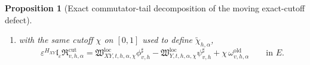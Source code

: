 \documentclass[11pt,a4paper]{amsart}
\theoremstyle{plain}
\newtheorem{proposition}[theorem]{Proposition}
\theoremstyle{definition}
\theoremstyle{remark}
\begin{document}
\begin{proposition}[Exact commutator-tail decomposition of the moving exact-cutoff defect]
\begin{enumerate}[label=(\roman*)]
and the rescaled old-tail source
\begin{equation}\label{eq:moving-cutoff-old-tail-local}
\omega_{v,h,\alpha}^{\mathrm{old}}
:=
\varepsilon^{H_{XY}}
\mathfrak l_{\varepsilon}
\mathfrak O_{v,h,\alpha}^{\mathrm{old}}
\in E,
\end{equation}
one has
\begin{equation}\label{eq:moving-cutoff-old-tail-local-id}
\mathfrak A_{XY,t,h,\alpha}\phi_{v,h}^{\sharp}
-
\mathfrak A_{Y,t,h,\alpha}\psi_{v,h}^{\sharp}
=
\omega_{v,h,\alpha}^{\mathrm{old}}
\qquad\text{in }E;
\end{equation}
\item with the same cutoff \(\chi\) on \([0,1]\) used to define \(\widetilde\chi_{h,\alpha}\),
\begin{equation}\label{eq:moving-cutoff-unit-reduction}
\varepsilon^{H_{XY}}
\mathfrak l_{\varepsilon}
\mathfrak R_{v,h,\alpha}^{\mathrm{cut}}
=
\mathfrak W_{XY,t,h,\alpha,\chi}^{\mathrm{loc}}
\phi_{v,h}^{\sharp}
-
\mathfrak W_{Y,t,h,\alpha,\chi}^{\mathrm{loc}}
\psi_{v,h}^{\sharp}
+
\chi\,\omega_{v,h,\alpha}^{\mathrm{old}}
\qquad\text{in }E.
\end{equation}
\end{enumerate}
\end{proposition}
\end{document}
